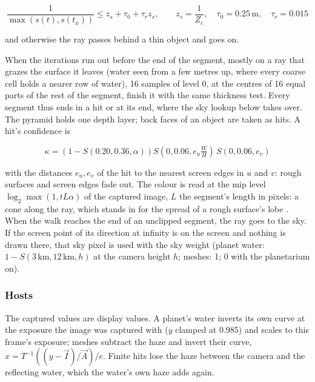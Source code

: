 \documentclass[Orbiter Technical Reference.tex]{subfiles}
\begin{document}
\begin{sloppypar}
\begin{itemize}
\[ \frac{1}{\max(s(t), s(t_{x}))} \le z_{s} + \tau_{0} + \tau_{r} z_{s}, \qquad z_{s} = \frac{1}{Z_{c}}, \quad \tau_{0} = 0.25\,\mathrm{m}, \quad \tau_{r} = 0.015 \]

and otherwise the ray passes behind a thin object and goes on.
\end{itemize}

\noindent
When the iterations run out before the end of the segment, mostly on a ray that grazes the surface it leaves (water seen from a few metres up, where every coarse cell holds a nearer row of water), 16 samples of level 0, at the centres of 16 equal parts of the rest of the segment, finish it with the same thickness test. Every segment thus ends in a hit or at its end, where the sky lookup below takes over.\\
The pyramid holds one depth layer; back faces of an object are taken as hits. A hit's confidence is

\[ \kappa = \left(1 - S(0.20, 0.36, \alpha)\right) S(0, 0.06, e_{u}\tfrac{W}{H})\, S(0, 0.06, e_{v}) \]

\noindent
with the distances $e_{u}, e_{v}$ of the hit to the nearest screen edges in $u$ and $v$: rough surfaces and screen edges fade out. The colour is read at the mip level $\log_{2}\max(1, t L \alpha)$ of the captured image, $L$ the segment's length in pixels: a cone along the ray, which stands in for the spread of a rough surface's lobe \cite{uludag2014}.\\
When the walk reaches the end of an unclipped segment, the ray goes to the sky. If the screen point of its direction at infinity is on the screen and nothing is drawn there, that sky pixel is used with the sky weight (planet water: $1 - S(3\,\mathrm{km}, 12\,\mathrm{km}, h)$ at the camera height $h$; meshes: 1; 0 with the planetarium on).

\subsubsection{Hosts}
The captured values are display values. A planet's water inverts its own curve at the exposure the image was captured with ($y$ clamped at 0.985) and scales to this frame's exposure; meshes subtract the haze and invert their curve, $x = T^{-1}((y - \vec{I})/\vec{A})/e$. Finite hits lose the haze between the camera and the reflecting water, which the water's own haze adds again.


\end{sloppypar}
\end{document}
